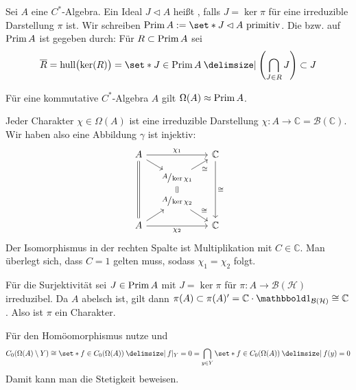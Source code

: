 \begin{definition}[label=def:718,{name=[primitives Ideal]}]
	Sei $A$ eine $C^*$-Algebra.
	Ein Ideal $J \lhd A$ heißt , falls $J= \ker \pi$ für eine irreduzible Darstellung $\pi$ ist.
	Wir schreiben $\Prim A  := \set*{J \lhd A \text{ primitiv}}$.
	Die  bzw.  auf $\operatorname{Prim} A$ ist gegeben durch:
	Für $R \subset \operatorname{Prim} A$ sei
	\[
		\overline{R} = \hull\enbrace[\big]{\ker(R)} = \set*{J \in \Prim A \given \enbrace*{\bigcap_{J \in R} J} \subset J}
	\]  
\end{definition}

\begin{satz}[label=satz:719,{name=[Für $A$ kommutativ ist das Charakterspektrum homöomorph zu den primitiven Idealen]}]
	Für eine kommutative $C^*$-Algebra $A$ gilt $\Omega(A) \approx \operatorname{Prim} A$.
\end{satz}
\begin{beweis}
	Jeder Charakter $\chi \in \Omega(A)$ ist eine irreduzible Darstellung $\chi \colon A \to \mathbb{C} = \mathcal{B}(\mathbb{C})$.
	Wir haben also eine Abbildung 
	$\gamma$ ist injektiv: 
	\[
		\begin{tikzcd}[sep=small]
			A \ar[rr,"\chi_1"] \ar[ddd,equal] \drar& & \mathbb{C} \ar[ddd,"\cong"]\\
			& \sfrac{A}{\ker \chi_1} \urar["\cong"'] \dar[equal] \\[-2.3pt]
			& \sfrac{A}{\ker \chi_2} \drar["\cong"] \\
			A \ar[rr,"\chi_2"'] \urar& & \mathbb{C}
		\end{tikzcd}
	\]
	Der Isomorphismus in der rechten Spalte ist Multiplikation mit $C \in \mathbb{C}$. 
	Man überlegt sich, dass $C=1$ gelten muss, sodass $\chi_1=\chi_2$ folgt.
	
	Für die Surjektivität sei $J \in \operatorname{Prim} A$ mit $J= \ker \pi$ für $\pi \colon A \to \mathcal{B}(\mathcal{H})$ irreduzibel.
	Da $A$ abelsch ist, gilt dann $\pi(A) \subset \pi(A)' = \mathbb{C} \cdot \ind_{\mathcal{B}(\mathcal{H})} \cong \mathbb{C}$.
	Also ist $\pi$ ein Charakter. 
	
	Für den Homöomorphismus nutze
	und 
	\[
		C_0 \enbrace*{\Omega(A) \setminus Y} \cong \set*{f \in C_0(\Omega(A)) \given f|_Y=0} = \bigcap_{y \in Y} \set*{f \in C_0(\Omega(A)) \given f(y)=0}
	\]
	Damit kann man die Stetigkeit beweisen.
\end{beweis}
\newpage

